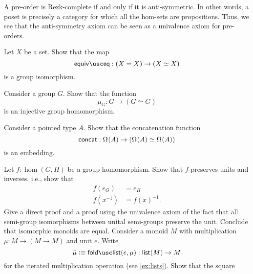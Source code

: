 \begin{eg}
  A pre-order is Rezk-complete if and only if it is anti-symmetric. In other words, a poset is precisely a category for which all the hom-sets are propositions. Thus, we see that the anti-symmetry axiom can be seen as a univalence axiom for pre-orders.
\end{eg}

\begin{exercises}
  \exercise Let $X$ be a set. Show that the map
  \begin{equation*}
    \equiveq : (X=X)\to (\eqv{X}{X})
  \end{equation*}
  is a group isomorphism.
  \exercise \label{ex:groupop-embedding}
  \begin{subexenum}
  \item Consider a group $G$. Show that the function
    \begin{equation*}
      \mu_G:G\to (G\simeq G)
    \end{equation*}
    is an injective group homomorphism.
  \item Consider a pointed type $A$. Show that the concatenation function
    \begin{equation*}
      \mathsf{concat}:\Omega^{}(A)\to (\Omega^{}(A)\simeq\Omega^{}(A))
    \end{equation*}
    is an embedding.
  \end{subexenum}
  \exercise Let $f:\hom(G,H)$ be a group homomorphism. Show that $f$ preserves units and inverses, i.e., show that
  \begin{align*}
    f(e_G) & = e_H \\
    f(x^{-1}) & = f(x)^{-1}.
  \end{align*}
  \exercise Give a direct proof and a proof using the univalence axiom of the fact that all semi-group isomorphisms between unital semi-groups preserve the unit. Conclude that isomorphic monoids are equal.
  \exercise Consider a monoid $M$ with multiplication $\mu:M\to (M\to M)$ and unit $e$. Write
  \begin{equation*}
    \bar{\mu}\defeq\foldlist(e,\mu):\lst(M)\to M
  \end{equation*}
  for the iterated multiplication operation (see \cref{ex:lists}). Show that the square
  \begin{equation*}

\end{equation*}
\end{exercises}
